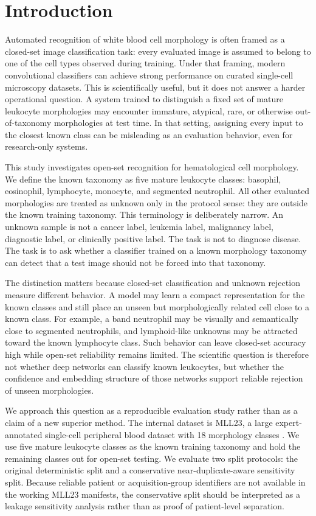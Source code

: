 \section{Introduction}

Automated recognition of white blood cell morphology is often framed as a closed-set image classification task: every evaluated image is assumed to belong to one of the cell types observed during training. Under that framing, modern convolutional classifiers can achieve strong performance on curated single-cell microscopy datasets. This is scientifically useful, but it does not answer a harder operational question. A system trained to distinguish a fixed set of mature leukocyte morphologies may encounter immature, atypical, rare, or otherwise out-of-taxonomy morphologies at test time. In that setting, assigning every input to the closest known class can be misleading as an evaluation behavior, even for research-only systems.

This study investigates open-set recognition for hematological cell morphology. We define the known taxonomy as five mature leukocyte classes: basophil, eosinophil, lymphocyte, monocyte, and segmented neutrophil. All other evaluated morphologies are treated as unknown only in the protocol sense: they are outside the known training taxonomy. This terminology is deliberately narrow. An unknown sample is not a cancer label, leukemia label, malignancy label, diagnostic label, or clinically positive label. The task is not to diagnose disease. The task is to ask whether a classifier trained on a known morphology taxonomy can detect that a test image should not be forced into that taxonomy.

The distinction matters because closed-set classification and unknown rejection measure different behavior. A model may learn a compact representation for the known classes and still place an unseen but morphologically related cell close to a known class. For example, a band neutrophil may be visually and semantically close to segmented neutrophils, and lymphoid-like unknowns may be attracted toward the known lymphocyte class. Such behavior can leave closed-set accuracy high while open-set reliability remains limited. The scientific question is therefore not whether deep networks can classify known leukocytes, but whether the confidence and embedding structure of those networks support reliable rejection of unseen morphologies.

We approach this question as a reproducible evaluation study rather than as a claim of a new superior method. The internal dataset is MLL23, a large expert-annotated single-cell peripheral blood dataset with 18 morphology classes \cite{mll23_nature_2025,mll23_zenodo_2024}. We use five mature leukocyte classes as the known training taxonomy and hold the remaining classes out for open-set testing. We evaluate two split protocols: the original deterministic split and a conservative near-duplicate-aware sensitivity split. Because reliable patient or acquisition-group identifiers are not available in the working MLL23 manifests, the conservative split should be interpreted as a leakage sensitivity analysis rather than as proof of patient-level separation.

